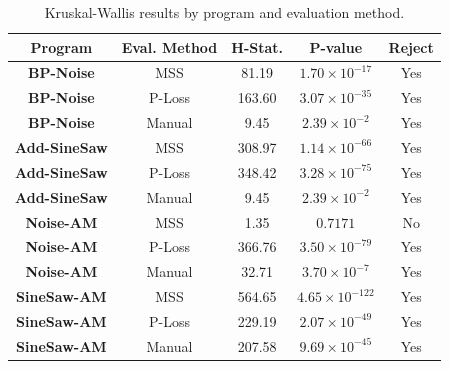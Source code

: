 \documentclass[lettersize,journal]{IEEEtran}
\newcommand{\BPNoise}{\textbf{BP-Noise}}
\newcommand{\AddSineSaw}{\textbf{Add-SineSaw}}
\newcommand{\AmpMod}{\textbf{Noise-AM}}
\newcommand{\FMMod}{\textbf{SineSaw-AM}}
\begin{document}
\begin{table}[ht]
\centering
\caption{Kruskal-Wallis results by program and evaluation method.}
\begin{tabular}{|c|c|c|c|c|}
\hline
\textbf{Program} & \textbf{Eval. Method} & \textbf{H-Stat.} & \textbf{P-value} & \textbf{Reject} \\
\hline
\BPNoise & MSS      & 81.19  & $1.70 \times 10^{-17}$ & Yes \\
\BPNoise & P-Loss  & 163.60 & $3.07 \times 10^{-35}$ & Yes \\
\BPNoise & Manual & 9.45  & $2.39 \times 10^{-2}$ & Yes \\
\AddSineSaw & MSS      & 308.97 & $1.14 \times 10^{-66}$ & Yes \\
\AddSineSaw & P-Loss  & 348.42 & $3.28 \times 10^{-75}$ & Yes \\
\AddSineSaw & Manual & 9.45  & $2.39 \times 10^{-2}$ & Yes \\
\AmpMod & MSS      & 1.35   & $0.7171$               & No \\
\AmpMod & P-Loss  & 366.76 & $3.50 \times 10^{-79}$ & Yes \\
\AmpMod & Manual & 32.71 & $3.70 \times 10^{-7}$ & Yes \\
\FMMod & MSS      & 564.65 & $4.65 \times 10^{-122}$ & Yes \\
\FMMod & P-Loss  & 229.19 & $2.07 \times 10^{-49}$ & Yes \\
\FMMod & Manual &  207.58 & $9.69 \times 10^{-45}$ & Yes \\
\hline
\end{tabular}
\label{tab:kruskal_auto}
\end{table}

\end{document}
